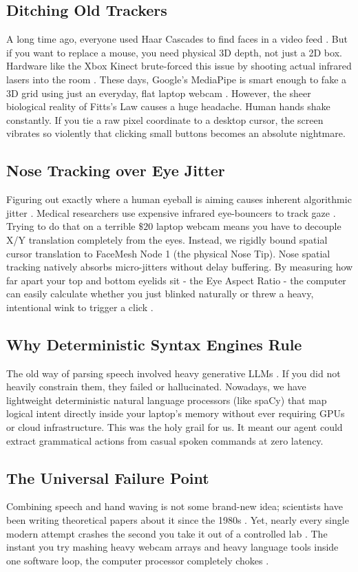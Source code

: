 \documentclass[conference]{IEEEtran}
\begin{document}
\subsection{Ditching Old Trackers}
A long time ago, everyone used Haar Cascades to find faces in a video feed \cite{b8}. But if you want to replace a mouse, you need physical 3D depth, not just a 2D box. Hardware like the Xbox Kinect brute-forced this issue by shooting actual infrared lasers into the room \cite{b18}. These days, Google's MediaPipe is smart enough to fake a 3D grid using just an everyday, flat laptop webcam \cite{b16}. However, the sheer biological reality of Fitts's Law \cite{b2} causes a huge headache. Human hands shake constantly. If you tie a raw pixel coordinate to a desktop cursor, the screen vibrates so violently that clicking small buttons becomes an absolute nightmare.

\subsection{Nose Tracking over Eye Jitter}
Figuring out exactly where a human eyeball is aiming causes inherent algorithmic jitter \cite{b11}. Medical researchers use expensive infrared eye-bouncers to track gaze \cite{b7}. Trying to do that on a terrible $\$20$ laptop webcam means you have to decouple X/Y translation completely from the eyes. Instead, we rigidly bound spatial cursor translation to FaceMesh Node 1 (the physical Nose Tip). Nose spatial tracking natively absorbs micro-jitters without delay buffering. By measuring how far apart your top and bottom eyelids sit - the Eye Aspect Ratio - the computer can easily calculate whether you just blinked naturally or threw a heavy, intentional wink to trigger a click \cite{b21}. 

\subsection{Why Deterministic Syntax Engines Rule}
The old way of parsing speech involved heavy generative LLMs \cite{b13}. If you did not heavily constrain them, they failed or hallucinated. Nowadays, we have lightweight deterministic natural language processors (like spaCy) \cite{b23} that map logical intent directly inside your laptop's memory without ever requiring GPUs or cloud infrastructure. This was the holy grail for us. It meant our agent could extract grammatical actions from casual spoken commands at zero latency.

\subsection{The Universal Failure Point}
Combining speech and hand waving is not some brand-new idea; scientists have been writing theoretical papers about it since the 1980s \cite{b14}. Yet, nearly every single modern attempt crashes the second you take it out of a controlled lab \cite{b20}. The instant you try mashing heavy webcam arrays and heavy language tools inside one software loop, the computer processor completely chokes \cite{b22}.
\end{document}
